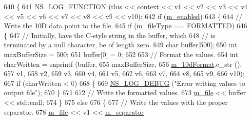 \begin{DoxyCode}
640 \{
641   \hyperlink{log-macros-disabled_8h_a90b90d5bad1f39cb1b64923ea94c0761}{NS\_LOG\_FUNCTION} (\textcolor{keyword}{this} << context << v1 << v2 << v3 << v4 << v5 << v6 << v7 << v8 << v9 << 
      v10);
642   \textcolor{keywordflow}{if} (\hyperlink{classns3_1_1DataCollectionObject_a3e8b0578f03044b1db4811ecff2be7ea}{m\_enabled})
643     \{
644       \textcolor{comment}{// Write the 10D data point to the file.}
645       \textcolor{keywordflow}{if} (\hyperlink{classns3_1_1FileAggregator_aa2a8abfe3082a802dc6705e701f73e9e}{m\_fileType} == \hyperlink{classns3_1_1FileAggregator_aedb3108205a498f7ac0c564508067e2da7e34fea5d3f680d09518ee58ce4711f0}{FORMATTED})
646         \{
647           \textcolor{comment}{// Initially, have the C-style string in the buffer, which}
648           \textcolor{comment}{// is terminated by a null character, be of length zero.}
649           \textcolor{keywordtype}{char} buffer[500];
650           \textcolor{keywordtype}{int} maxBufferSize = 500;
651           buffer[0] = 0;
652 
653           \textcolor{comment}{// Format the values.}
654           \textcolor{keywordtype}{int} charWritten = snprintf (buffer,
655                                       maxBufferSize,
656                                       \hyperlink{classns3_1_1FileAggregator_a737006d5ab018c7f7d3b00bf85040015}{m\_10dFormat}.c\_str (),
657                                       v1,
658                                       v2,
659                                       v3,
660                                       v4,
661                                       v5,
662                                       v6,
663                                       v7,
664                                       v8,
665                                       v9,
666                                       v10);
667           \textcolor{keywordflow}{if} (charWritten < 0)
668             \{
669               \hyperlink{group__logging_ga413f1886406d49f59a6a0a89b77b4d0a}{NS\_LOG\_DEBUG} (\textcolor{stringliteral}{"Error writing values to output file"});
670             \}
671 
672           \textcolor{comment}{// Write the formatted values.}
673           \hyperlink{classns3_1_1FileAggregator_a756affa0d614724be513ceedcff62ac0}{m\_file} << buffer << std::endl;
674         \}
675       \textcolor{keywordflow}{else}
676         \{
677           \textcolor{comment}{// Write the values with the proper separator.}
678           \hyperlink{classns3_1_1FileAggregator_a756affa0d614724be513ceedcff62ac0}{m\_file} << v1 << \hyperlink{classns3_1_1FileAggregator_a1f74a4c07f663d535da56dfb70414a15}{m\_separator}

\end{DoxyCode}
